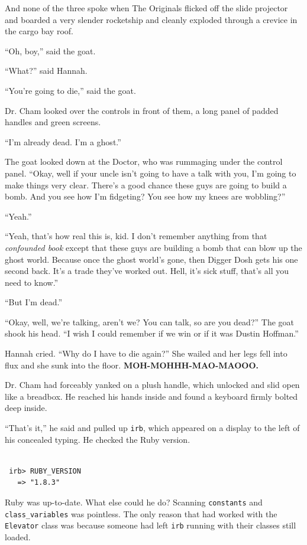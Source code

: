 \documentclass[10pt,twoside]{report}
\begin{document}
And none of the three spoke when The Originals flicked off the slide
projector and boarded a very slender rocketship and cleanly exploded
through a crevice in the cargo bay roof.

``Oh, boy,'' said the goat.

``What?'' said Hannah.

``You're going to die,'' said the goat.

Dr. Cham looked over the controls in front of them, a long panel of
padded handles and green screens.

``I'm already dead.  I'm a ghost.''

The goat looked down at the Doctor, who was rummaging under the
control panel.  ``Okay, well if your uncle isn't going to have a talk
with you, I'm going to make things very clear.  There's a good chance
these guys are going to build a bomb.  And you see how I'm fidgeting?
You see how my knees are wobbling?''

``Yeah.''

``Yeah, that's how real this is, kid.  I don't remember anything from
that {\em confounded book} except that these guys are building a bomb
that can blow up the ghost world.  Because once the ghost world's
gone, then Digger Dosh gets his one second back.  It's a trade they've
worked out.  Hell, it's sick stuff, that's all you need to know.''

``But I'm dead.''

``Okay, well, we're talking, aren't we?  You can talk, so are you
dead?''  The goat shook his head. ``I wish I could remember if we win
or if it was Dustin Hoffman.''

Hannah cried.  ``Why do I have to die again?''  She wailed and her
legs fell into flux and she sunk into the floor.  {\bf
  MOH-MOHHH-MAO-MAOOO.}

Dr. Cham had forceably yanked on a plush handle, which unlocked and
slid open like a breadbox. He reached his hands inside and found a
keyboard firmly bolted deep inside.

``That's it,'' he said and pulled up \lstinline[breaklines=true]|irb|,
which appeared on a display to the left of his concealed typing.  He
checked the Ruby version.


\begin{lstlisting}

 irb> RUBY_VERSION
   => "1.8.3"

\end{lstlisting}


Ruby was up-to-date.  What else could he do?  Scanning
\lstinline[breaklines=true]|constants| and
\lstinline[breaklines=true]|class_variables| was pointless. The only
reason that had worked with the \lstinline[breaklines=true]|Elevator|
class was because someone had left \lstinline[breaklines=true]|irb|
running with their classes still loaded.
\end{document}
